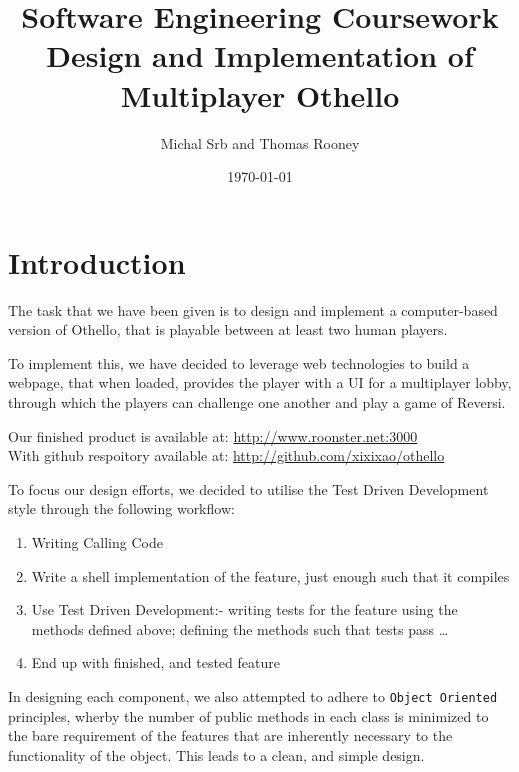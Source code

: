 \documentclass[a4wide, 11pt]{article}
\begin{document}
\title{Software Engineering Coursework \\ Design and Implementation of Multiplayer Othello}

\author{Michal Srb and Thomas Rooney}

\date{\today}         %

\maketitle            %

\section{Introduction}

The task that we have been given is to design and implement a computer-based version of Othello, that is playable between at least two human players.

To implement this, we have decided to leverage web technologies to build a webpage, that when loaded, provides the player with a UI for a multiplayer lobby, through which the players can challenge one another and play a game of Reversi.

Our finished product is available at: \href{http://www.roonster.net:3000}{http://www.roonster.net:3000} \\
With github respoitory available at: \href{http://github.com/xixixao/othello}{http://github.com/xixixao/othello}

To focus our design efforts, we decided to utilise the Test Driven Development style through the following workflow:
\begin{enumerate}
\item Writing Calling Code
\item Write a shell implementation of the feature, just enough such that it compiles
\item Use Test Driven Development:- writing tests for the feature using the methods defined above; defining the methods such that tests pass \ldots
\item End up with finished, and tested feature
\end{enumerate}

In designing each component, we also attempted to adhere to \texttt{Object Oriented} principles, wherby the number of public methods in each class is minimized to the bare requirement of the features that are inherently necessary to the functionality of the object. This leads to a clean, and simple design.
\end{document}
